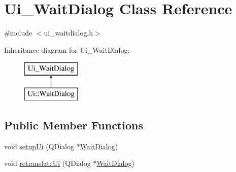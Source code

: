 \hypertarget{class_ui___wait_dialog}{}\section{Ui\+\_\+\+Wait\+Dialog Class Reference}
\label{class_ui___wait_dialog}


{\ttfamily \#include $<$ui\+\_\+waitdialog.\+h$>$}

Inheritance diagram for Ui\+\_\+\+Wait\+Dialog\+:\begin{figure}[H]
\begin{center}
\leavevmode
\includegraphics[height=2.000000cm]{d5/d26/class_ui___wait_dialog}
\end{center}
\end{figure}
\subsection*{Public Member Functions}
\begin{DoxyCompactItemize}
\item 
void \mbox{\hyperlink{class_ui___wait_dialog_a4d534ceaf04b755efd9fed3f0ee5d34f}{setup\+Ui}} (Q\+Dialog $\ast$\mbox{\hyperlink{class_wait_dialog}{Wait\+Dialog}})
\item 
void \mbox{\hyperlink{class_ui___wait_dialog_a617a5df2482de8feec9d8b1fe35ea05a}{retranslate\+Ui}} (Q\+Dialog $\ast$\mbox{\hyperlink{class_wait_dialog}{Wait\+Dialog}})
\end{DoxyCompactItemize}
